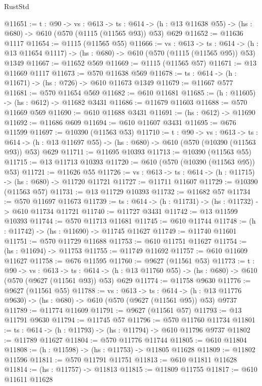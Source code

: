 \begin{lexlean}{RustStd}
\begin{coremodule}
@11651 := {t : @90} ->
  {vs : @613} ->
  {ts : @614} -> (h : @13 @11638 @55) -> (hs : @680) -> @610 (@570 (@1115 (@11565 @93)) @53) @629
@11652 := @11636 @1117
@11654 := @1115 (@11565 @55)
@11666 := {vs : @613} ->
  {ts : @614} -> (h : @13 @11654 @1117) -> (hs : @680) -> @610 (@570 (@1115 (@11565 @95)) @53) @1349
@11667 := @11652 @569
@11669 := @1115 (@11565 @57)
@11671 := @13 @11669 @1117
@11673 := @570 @11638 @569
@11678 := {ts : @614} -> (h : @11671) -> (hs : @726) -> @610 @11673 @1349
@11679 := @11667 @577
@11681 := @570 @11654 @569
@11682 := @610 @11681
@11685 := (h : @11605) -> (hs : @612) -> @11682 @3431
@11686 := @11679 @11603
@11688 := @570 @11669 @569
@11690 := @610 @11688 @3431
@11691 := (hs : @612) -> @11690
@11692 := @11686 @609
@11694 := @610 @11607 @3431
@11695 := @676 @11599
@11697 := @10390 (@11563 @53)
@11710 := {t : @90} ->
  {vs : @613} ->
  {ts : @614} -> (h : @13 @11697 @55) -> (hs : @680) -> @610 (@570 (@10390 (@11563 @93)) @53) @629
@11711 := @11695 @10393
@11713 := @10390 (@11563 @55)
@11715 := @13 @11713 @10393
@11720 := @610 (@570 (@10390 (@11563 @95)) @53)
@11721 := @11626 @55
@11726 := {vs : @613} -> {ts : @614} -> (h : @11715) -> (hs : @680) -> @11720 @11721
@11727 := @11711 @11607
@11729 := @10390 (@11563 @57)
@11731 := @13 @11729 @10393
@11732 := @11682 @57
@11734 := @570 @11697 @11673
@11739 := {ts : @614} -> (h : @11731) -> (hs : @11732) -> @610 @11734 @11721
@11740 := @11727 @3431
@11742 := @13 @11599 @10393
@11744 := @570 @11713 @11681
@11745 := @610 @11744
@11748 := (h : @11742) -> (hs : @11690) -> @11745 @11627
@11749 := @11740 @11601
@11751 := @570 @11729 @11688
@11753 := @610 @11751 @11627
@11754 := (hs : @11694) -> @11753
@11755 := @11749 @11692
@11757 := @610 @11609 @11627
@11758 := @676 @11595
@11760 := @9627 (@11561 @53)
@11773 := {t : @90} ->
  {vs : @613} ->
  {ts : @614} -> (h : @13 @11760 @55) -> (hs : @680) -> @610 (@570 (@9627 (@11561 @93)) @53) @629
@11774 := @11758 @9630
@11776 := @9627 (@11561 @55)
@11788 := {vs : @613} ->
  {ts : @614} -> (h : @13 @11776 @9630) -> (hs : @680) -> @610 (@570 (@9627 (@11561 @95)) @53) @9737
@11789 := @11774 @11609
@11791 := @9627 (@11561 @57)
@11793 := @13 @11791 @9630
@11794 := @11745 @57
@11796 := @570 @11760 @11734
@11801 := {ts : @614} -> (h : @11793) -> (hs : @11794) -> @610 @11796 @9737
@11802 := @11789 @11627
@11804 := @570 @11776 @11744
@11805 := @610 @11804
@11808 := (h : @11598) -> (hs : @11753) -> @11805 @11628
@11809 := @11802 @11596
@11811 := @570 @11791 @11751
@11813 := @610 @11811 @11628
@11814 := (hs : @11757) -> @11813
@11815 := @11809 @11755
@11817 := @610 @11611 @11628

\end{coremodule}
\end{lexlean}
